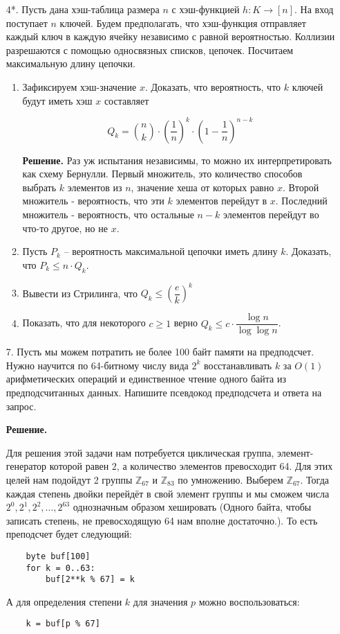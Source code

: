 \begin{enumerate}
	\item[4*.] Пусть дана хэш-таблица размера $n$ с хэш-функцией $h : K \rightarrow [n]$. На вход поступает $n$ 
	ключей. Будем предполагать, что хэш-функция отправляет каждый ключ в каждую ячейку независимо с равной 
	вероятностью. Коллизии разрешаются с помощью односвязных списков, цепочек. Посчитаем максимальную длину 
	цепочки.
	
	\begin{enumerate}
		\item Зафиксируем хэш-значение $x$. Доказать, что вероятность, что $k$ ключей будут иметь хэш $x$ 
		составляет
		
		\begin{equation*}
			Q_k = \binom{n}{k}\cdot \left( \frac{1}{n} \right)^k \cdot \left(1 - \frac{1}{n} \right)^{n-k}
		\end{equation*}
		
		\textbf{Решение.} Раз уж испытания независимы, то можно их интерпретировать как схему Бернулли. Первый 
		множитель, это количество способов выбрать $k$ элементов из $n$, значение хеша от которых равно $x$. 
		Второй множитель - вероятность, что эти $k$ элементов перейдут в $x$. Последний множитель - вероятность, 
		что остальные $n - k$ элементов перейдут во что-то другое, но не $x$.
		
		\item Пусть $P_k$ – вероятность максимальной цепочки иметь длину $k$. Доказать, что $P_k \leqslant n 
		\cdot Q_k$.
		
		\item Вывести из Стрилинга, что $Q_k \le \left(\dfrac{e}{k}\right)^k$
		\item Показать, что для некоторого $c \ge 1$ верно $Q_k \leqslant c \cdot \dfrac{\log n}{\log \log n}$.
	\end{enumerate}
	
	\item[7.] Пусть мы можем потратить не более 100 байт памяти на предподсчет. Нужно научится по 64-битному 
	числу вида $2^k$ восстанавливать $k$ за $O(1)$ арифметических операций и единственное
	чтение одного байта из предподсчитанных данных. Напишите псевдокод предподсчета и ответа на 
	запрос.
	
	\textbf{Решение.}
	
	Для решения этой задачи нам потребуется циклическая группа, элемент-генератор которой равен $2$, а количество 
	элементов превосходит 64. Для этих целей нам подойдут 2 группы $\mathbb{Z}_{67}$ и $\mathbb{Z}_{83}$ по 
	умножению. Выберем $\mathbb{Z}_{67}$. Тогда каждая степень двойки перейдёт в свой элемент группы и мы сможем 
	числа $2^0, 2^1, 2^2, ..., 2^{63}$ однозначным образом хешировать (Одного байта, чтобы записать степень, не превосходящую 64 нам вполне достаточно.). То есть преподсчет будет следующий:
	\begin{lstlisting}
	byte buf[100]
	for k = 0..63:
		buf[2**k % 67] = k
	\end{lstlisting}
	А для определения степени $k$ для значения $p$ можно воспользоваться:
	\begin{lstlisting}
	k = buf[p % 67]
	\end{lstlisting}
	

\end{enumerate}
